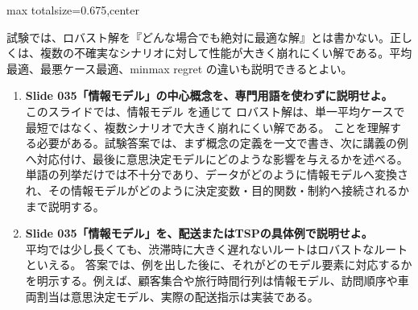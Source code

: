 \begin{adjustbox}{max totalsize={\textwidth}{0.675\textheight},center}
\begin{minipage}{\textwidth}
\begin{minipage}[t]{0.485\textwidth}
試験では、ロバスト解を『どんな場合でも絶対に最適な解』とは書かない。正しくは、複数の不確実なシナリオに対して性能が大きく崩れにくい解である。平均最適、最悪ケース最適、minmax regret の違いも説明できるとよい。\par
{}
\begin{enumerate}
\item \textbf{Slide 035「情報モデル」の中心概念を、専門用語を使わずに説明せよ。}\\このスライドでは、情報モデル を通じて ロバスト解は、単一平均ケースで最短ではなく、複数シナリオで大きく崩れにくい解である。 ことを理解する必要がある。試験答案では、まず概念の定義を一文で書き、次に講義の例へ対応付け、最後に意思決定モデルにどのような影響を与えるかを述べる。単語の列挙だけでは不十分であり、データがどのように情報モデルへ変換され、その情報モデルがどのように決定変数・目的関数・制約へ接続されるかまで説明する。
\item \textbf{Slide 035「情報モデル」を、配送またはTSPの具体例で説明せよ。}\\平均では少し長くても、渋滞時に大きく遅れないルートはロバストなルートといえる。 答案では、例を出した後に、それがどのモデル要素に対応するかを明示する。例えば、顧客集合や旅行時間行列は情報モデル、訪問順序や車両割当は意思決定モデル、実際の配送指示は実装である。
\end{enumerate}
\end{minipage}
\end{minipage}
\end{adjustbox}

